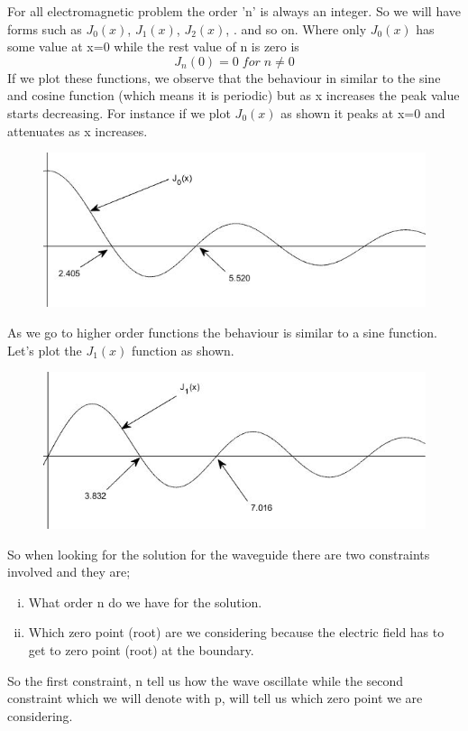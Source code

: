 For all electromagnetic problem the order 'n' is always an integer. So we will have forms such as $ J_0(x) $, $ J_1(x) $, $ J_2(x) $, . and so on. Where only $J_0(x)$ has some value at x{=}0 while the rest value of n is zero is 
\[ J_n(0)=0 \; for \; n \neq 0 \]
If we plot these functions, we observe that the behaviour in similar to the sine and cosine function (which means it is periodic) but as x increases the peak value starts decreasing. For instance if we plot $J_0(x)$ as shown it peaks at x=0 and attenuates as x increases.
\begin{figure}[h]
\centering
\includegraphics[width=1\linewidth]{./graphics/fig_1.1}
\caption{}
\label{fig:fig1}
\end{figure}

As we go to higher order functions the behaviour is similar to a sine function. Let's plot the $J_1(x)$ function as shown.
\begin{figure}[h]
\centering
\includegraphics[width=1\linewidth]{./graphics/fig_2.1}
\caption{}
\label{fig:fig2}
\end{figure}

So when looking for the solution for the waveguide there are two constraints involved and they are;
\begin{enumerate}[(i)]
\item What order n do we have for the solution.
\item Which zero point (root) are we considering because the electric field has to get to zero point (root) at the boundary.
\end{enumerate}
 So the first constraint, n tell us how the wave oscillate while the second constraint which we will denote with p, will tell us which zero point we are considering. 

